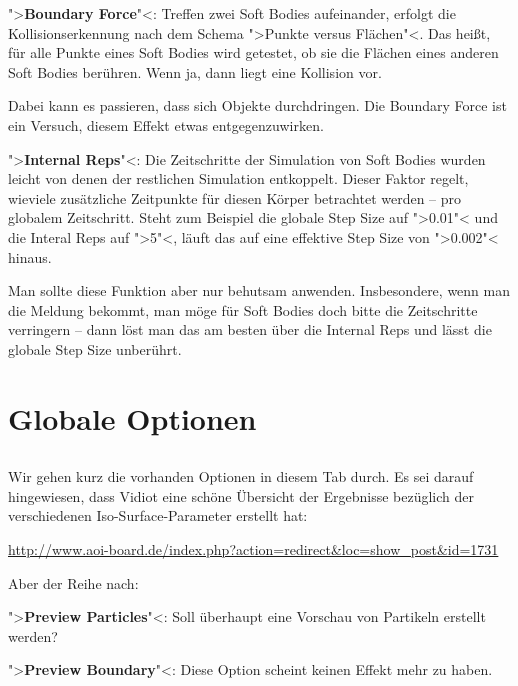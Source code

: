 \documentclass[10pt,DIV=14,a4paper]{scrartcl}
\begin{document}
	\item ">\textbf{Boundary Force}"<: Treffen zwei Soft Bodies
	aufeinander, erfolgt die Kollisionserkennung nach dem Schema
	">Punkte versus Flächen"<. Das heißt, für alle Punkte eines Soft
	Bodies wird getestet, ob sie die Flächen eines anderen Soft Bodies
	berühren. Wenn ja, dann liegt eine Kollision vor.

	Dabei kann es passieren, dass sich Objekte durchdringen. Die
	Boundary Force ist ein Versuch, diesem Effekt etwas
	entgegenzuwirken.

	\item ">\textbf{Internal Reps}"<: Die Zeitschritte der Simulation
	von Soft Bodies wurden leicht von denen der restlichen Simulation
	entkoppelt. Dieser Faktor regelt, wieviele zusätzliche Zeitpunkte
	für diesen Körper betrachtet werden -- pro globalem Zeitschritt.
	Steht zum Beispiel die globale Step Size auf ">0.01"< und die
	Interal Reps auf ">5"<, läuft das auf eine effektive Step Size von
	">0.002"< hinaus.

	Man sollte diese Funktion aber nur behutsam anwenden. Insbesondere,
	wenn man die Meldung bekommt, man möge für Soft Bodies doch bitte
	die Zeitschritte verringern -- dann löst man das am besten über die
	Internal Reps und lässt die globale Step Size unberührt.

\itE




\pagebreak
\section{Globale Optionen}

\subsection{}
Wir gehen kurz die vorhanden Optionen in diesem Tab durch. Es sei darauf
hingewiesen, dass Vidiot eine schöne Übersicht der Ergebnisse bezüglich
der verschiedenen Iso-Surface-Parameter erstellt hat:

\url{http://www.aoi-board.de/index.php?action=redirect&loc=show_post&id=1731}

Aber der Reihe nach:

\itA
	\item ">\textbf{Preview Particles}"<: Soll überhaupt eine Vorschau
	von Partikeln erstellt werden?

	\item ">\textbf{Preview Boundary}"<: Diese Option scheint keinen
	Effekt mehr zu haben.
\end{document}
